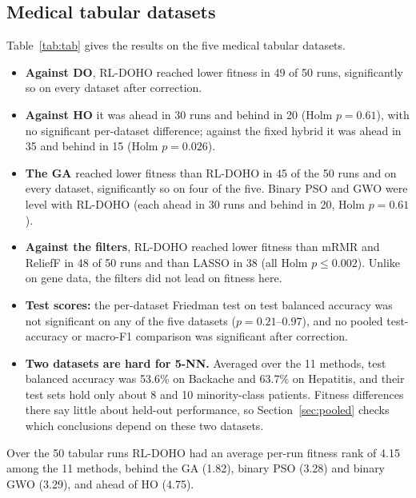 \documentclass[journal]{IEEEtran}
\begin{document}
\subsection{Medical tabular datasets}
Table~\ref{tab:tab} gives the results on the five medical tabular datasets.
\begin{itemize}
\item \textbf{Against DO}, RL-DOHO reached lower fitness in 49 of 50 runs, significantly so on every dataset after correction.
\item \textbf{Against HO} it was ahead in 30 runs and behind in 20 (Holm $p=0.61$), with no significant per-dataset difference; against the fixed hybrid it was ahead in 35 and behind in 15 (Holm $p=0.026$).
\item \textbf{The GA} reached lower fitness than RL-DOHO in 45 of the 50 runs and on every dataset, significantly so on four of the five. Binary PSO and GWO were level with RL-DOHO (each ahead in 30 runs and behind in 20, Holm $p=0.61$).
\item \textbf{Against the filters}, RL-DOHO reached lower fitness than mRMR and ReliefF in 48 of 50 runs and than LASSO in 38 (all Holm $p\le0.002$). Unlike on gene data, the filters did not lead on fitness here.
\item \textbf{Test scores:} the per-dataset Friedman test on test balanced accuracy was not significant on any of the five datasets ($p=0.21$--$0.97$), and no pooled test-accuracy or macro-F1 comparison was significant after correction.
\item \textbf{Two datasets are hard for 5-NN.} Averaged over the 11 methods, test balanced accuracy was 53.6\% on Backache and 63.7\% on Hepatitis, and their test sets hold only about 8 and 10 minority-class patients. Fitness differences there say little about held-out performance, so Section~\ref{sec:pooled} checks which conclusions depend on these two datasets.
\end{itemize}
Over the 50 tabular runs RL-DOHO had an average per-run fitness rank of 4.15 among the 11 methods, behind the GA (1.82), binary PSO (3.28) and binary GWO (3.29), and ahead of HO (4.75).
\end{document}
